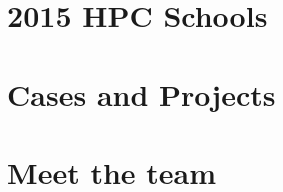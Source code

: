 \documentclass{article}
\begin{document}





\section{\faCalendar\ 2015 HPC Schools}



\section{\faFileAlt\ Cases and Projects}




\clearpage
\section{\faUser\ Meet the team}

\end{document}
